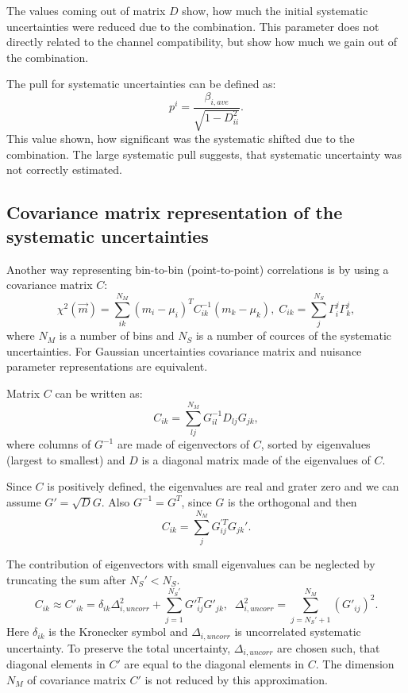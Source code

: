 The values coming out of matrix $D$ show, how much the initial systematic uncertainties were reduced due to the combination. This parameter does not directly related to the channel compatibility, but show how much we gain out of the combination. 

The pull for systematic uncertainties can be defined as:
\begin{equation}
p^{i} = \frac{\beta_{i,ave}}{\sqrt{1 - D_{ii}^2} }.
\label{Eq:PullSyst}
\end{equation}
This value shown, how significant was the systematic shifted due to the combination. The large systematic pull suggests, that systematic uncertainty was not correctly estimated.

\subsection{Covariance matrix representation of the systematic uncertainties}
\label{sec:decomposition}
Another way representing bin-to-bin (point-to-point) correlations is by using a covariance matrix $C$:
\begin{equation}
\chi^2(\vec{m}) = \sum_{ik}^{N_M} (m_i-\mu_i)^T C_{ik}^{-1} (m_k-\mu_k), \; 
C_{ik} = \sum_{j}^{N_S}\Gamma^j_i \Gamma^j_k,
\label{Eq:ChiCovar}
\end{equation}
where $N_M$ is a number of bins and $N_S$ is a number of cources of the systematic uncertainties. For Gaussian uncertainties covariance matrix and nuisance parameter representations are equivalent.

Matrix $C$ can be written as:
\begin{equation}
C_{ik} = \sum_{lj}^{N_M} G^{-1}_{il} D_{lj} G_{jk},
\label{Eq:Decomposition}
\end{equation}
where columns of $G^{-1}$ are made of eigenvectors of $C$, sorted by eigenvalues (largest to smallest) and $D$ is a diagonal matrix made of the eigenvalues of $C$.

Since $C$ is positively defined, the eigenvalues are real and grater zero and we can assume $G' = \sqrt{D}G$. Also $G^{-1} = G^T$, since $G$ is the orthogonal and then
 \begin{equation}
C_{ik} = \sum_{j}^{N_M} G_{ij}^{'T} G_{jk}'.
\end{equation}

The contribution of eigenvectors with small eigenvalues can be neglected by truncating the sum after $N_S' < N_S$.
\begin{equation}
C_{ik} \approx C'_{ik} = \delta_{ik}\Delta^2_{i, uncorr} + \sum_{j=1}^{N_S'} G'^T_{ij}G'_{jk}, \;\;
\Delta^2_{i, uncorr} = \sum_{j=N_S'+1}^{N_M} (G'_{ij})^2.
\end{equation}
Here $\delta_{ik}$ is the Kronecker symbol and  $\Delta_{i, uncorr}$ is uncorrelated systematic uncertainty. To preserve the total uncertainty, $\Delta_{i, uncorr}$ are chosen such, that diagonal elements in $C'$ are equal to the diagonal elements in $C$. The dimension $N_M$ of covariance matrix $C'$ is not reduced by this approximation. 

